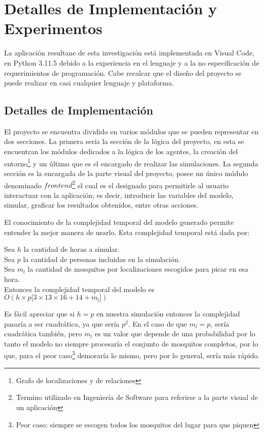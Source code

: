 \chapter{Detalles de Implementación y Experimentos}\label{chapter:implementation}
La aplicación resultane de esta investigación está implementada en Visual Code, en Python 3.11.5
debido a la experiencia en el lenguaje y a la no especificación de requerimientos de programación. Cabe 
recalcar que el diseño del proyecto se puede realizar en casi cualquier lenguaje y plataforma.

\section{Detalles de Implementación}
El proyecto se encuentra dividido en varios módulos que se pueden representar en dos secciones.
La primera sería la sección de la lógica del proyecto, en esta se encuentran los módulos dedicados 
a la lógica de los agentes, la creación del entorno\footnote{Grafo de localizaciones y de relaciones}
y un último que es el encargado de realizar las simulaciones. La segunda sección es la encargada de 
la parte visual del proyecto, posee un único módulo denominado $frontend$\footnote{Termino utilizado en 
Ingeniería de Software para referirse a la parte visual de un aplicación} el cual es el designado para permitirle
al usuario interactuar con la aplicación; es decir, introducir las variables del modelo, simular, 
graficar los resultados obtenidos, entre otras acciones.

El conocimiento de la complejidad temporal del modelo generado permite entender la mejor manera de usarlo.
Esta complejidad temporal está dada por:
\begin{center}
    Sea $h$ la cantidad de horas a simular.\\
    Sea $p$ la cantidad de personas incluidas en la simulación.\\
    Sea $m_l$ la cantidad de mosquitos por localizaciones escogidos para picar en esa hora.\\
    Entonces la complejidad temporal del modelo es $O(h \times p \lbrack 3 \times 13 \times 16 + 14 + m_l \rbrack)$
\end{center}

Es fácil apreciar que si $h = p$ en nuestra simulación entonces la complejidad pasaría a ser cuadrática, ya 
que sería $p^2$. En el caso de que $m_l = p$, sería cuadrática también, pero $m_l$ es un valor 
que depende de una probabilidad por lo tanto el modelo no siempre procesaría el conjunto de mosquitos completos,
por lo que, para el peor caso\footnote{Peor caso: siempre se escogen todos los mosquitos del lugar para que piquen} demoraría
lo mismo, pero por lo general, sería más rápido.



